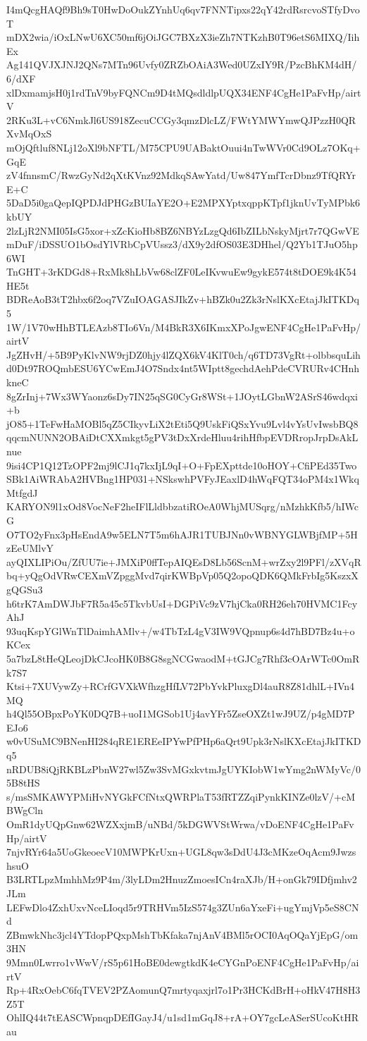 I4mQcgHAQf9Bh9sT0HwDoOukZYnhUq6qv7FNNTipxs22qY42rdRsrcvoSTfyDvoT
mDX2wia/iOxLNwU6XC50mf6jOiJGC7BXzX3ieZh7NTKzhB0T96etS6MIXQ/IihEx
Ag141QVJXJNJ2QNs7MTn96Uvfy0ZRZbOAiA3Wed0UZxIY9R/PzcBhKM4dH/6/dXF
xlDxmamjsH0j1rdTnV9byFQNCm9D4tMQsdldlpUQX34ENF4CgHe1PaFvHp/airtV
2RKu3L+vC6NmkJl6US918ZecuCCGy3qmzDlcLZ/FWtYMWYmwQJPzzH0QRXvMqOxS
mOjQftluf8NLj12oXl9bNFTL/M75CPU9UABaktOuui4nTwWVr0Cd9OLz7OKq+GqE
zV4fnnsmC/RwzGyNd2qXtKVnz92MdkqSAwYatd/Uw847YmfTcrDbnz9TfQRYrE+C
5DaD5i0gaQepIQPDJdPHGzBUIaYE2O+E2MPXYptxqppKTpf1jknUvTyMPbk6kbUY
2lzLjR2NMI05IsG5xor+xZcKioHb8BZ6NBYzLzgQd6IbZILbNskyMjrt7r7QGwVE
mDuF/iDSSUO1bOsdYlVRbCpVUssz3/dX9y2dfOS03E3DHhel/Q2Yb1TJuO5hp6WI
TnGHT+3rKDGd8+RxMk8hLbVw68clZF0LeIKvwuEw9gykE574t8tDOE9k4K54HE5t
BDReAoB3tT2hbx6f2oq7VZuIOAGASJIkZv+hBZk0u2Zk3rNslKXcEtajJkITKDq5
1W/1V70wHhBTLEAzb8TIo6Vn/M4BkR3X6IKmxXPoJgwENF4CgHe1PaFvHp/airtV
JgZHvH/+5B9PyKlvNW9rjDZ0hjy4lZQX6kV4KlT0ch/q6TD73VgRt+olbbsquLih
d0Dt97ROQmbESU6YCwEmJ4O7Sndx4nt5WIptt8gechdAehPdeCVRURv4CHnhkneC
8gZrInj+7Wx3WYaonz6sDy7IN25qSG0CyGr8WSt+1JOytLGbnW2ASrS46wdqxi+b
jO85+1TeFwHaMOBl5qZ5CIkyvLiX2tEti5Q9UskFiQSxYvu9Lvl4vYsUvIwsbBQ8
qqcmNUNN2OBAiDtCXXmkgt5gPV3tDxXrdeHluu4rihHfbpEVDRropJrpDsAkLnue
9isi4CP1Q12TzOPF2mj9lCJ1q7kxIjL9qI+O+FpEXpttde10oHOY+CfiPEd35Two
SBk1AiWRAbA2HVBng1HP031+NSkswhPVFyJEaxlD4hWqFQT34oPM4x1WkqMtfgdJ
KARYON9l1xOd8VocNeF2heIFlLldbbzatiROeA0WhjMUSqrg/nMzhkKfb5/hIWcG
O7TO2yFnx3pHsEndA9w5ELN7T5m6hAJR1TUBJNn0vWBNYGLWBjfMP+5HzEeUMlvY
ayQIXLIPiOu/ZfUU7ie+JMXiP0ffTepAIQEsD8Lb56ScnM+wrZxy2l9PFl/zXVqR
bq+yQgOdVRwCEXmVZpggMvd7qirKWBpVp05Q2opoQDK6QMkFrbIg5KszxXgQGSu3
h6trK7AmDWJbF7R5a45c5TkvbUsI+DGPiVc9zV7hjCka0RH26eh70HVMC1FcyAhJ
93uqKspYGlWnTlDaimhAMlv+/w4TbTzL4gV3IW9VQpnup6s4d7hBD7Bz4u+oKCex
5a7bzL8tHeQLeojDkCJcoHK0B8G8sgNCGwaodM+tGJCg7Rhf3cOArWTc0OmRk7S7
Ktsi+7XUVywZy+RCrfGVXkWfhzgHfLV72PbYvkPluxgDl4auR8Z81dhlL+IVn4MQ
h4Ql55OBpxPoYK0DQ7B+uoI1MGSob1Uj4avYFr5ZseOXZt1wJ9UZ/p4gMD7PEJo6
w0vUSuMC9BNenHI284qRE1EREeIPYwPfPHp6aQrt9Upk3rNslKXcEtajJkITKDq5
nRDUB8iQjRKBLzPbnW27wl5Zw3SvMGxkvtmJgUYKIobW1wYmg2nWMyVc/05B8tHS
s/msSMKAWYPMiHvNYGkFCfNtxQWRPlaT53fRTZZqiPynkKINZe0lzV/+cMBWgCln
OmR1dyUQpGnw62WZXxjmB/uNBd/5kDGWVStWrwa/vDoENF4CgHe1PaFvHp/airtV
7njvRYr64a5UoGkeoecV10MWPKrUxn+UGL8qw3sDdU4J3cMKzeOqAcm9JwzshsuO
B3LRTLpzMmhhMz9P4m/3lyLDm2HnuzZmoesICn4raXJb/H+onGk79IDfjmhv2JLm
LEFwDlo4ZxhUxvNceLIoqd5r9TRHVm5IzS574g3ZUn6aYxeFi+ugYmjVp5eS8CNd
ZBmwkNhc3jcl4YTdopPQxpMshTbKfaka7njAnV4BMl5rOCI0AqOQaYjEpG/om3HN
9Mmn0Lwrro1vWwV/rS5p61HoBE0dewgtkdK4eCYGnPoENF4CgHe1PaFvHp/airtV
Rp+4RxOebC6fqTVEV2PZAomunQ7mrtyqaxjrl7o1Pr3HCKdBrH+oHkV47H8H3Z5T
OhlIQ44t7tEASCWpnqpDEfIGayJ4/u1sd1mGqJ8+rA+OY7gcLeASerSUcoKtHRau
